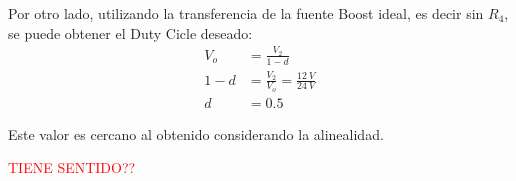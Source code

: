 Por otro lado, utilizando la transferencia de la fuente Boost ideal, es decir sin $R_4$, se puede obtener el Duty Cicle deseado:
\begin{align*}
V_o &= \frac{V_2}{1 - d}	\\
1 - d &= \frac{V_2}{V_o} = \frac{12 \ V}{24 \ V} \\
d &= 0.5
\end{align*}

Este valor es cercano al obtenido considerando la alinealidad.
\begin{center}
\huge{ \textcolor{red}{TIENE SENTIDO??} }
\end{center}

